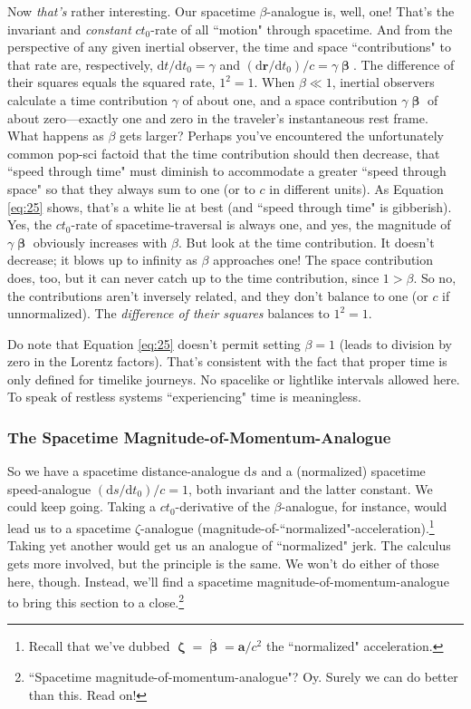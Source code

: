 \documentclass[12pt]{article}
\renewcommand{\vv}[1]{\mathbf{#1}}
\newcommand{\dd}[1]{\mathrm{d}#1}
\newcommand{\vvbeta}{\bm{\upbeta}}
\newcommand{\vvzeta}{\bm{\upzeta}}
\begin{document}
Now \emph{that's} rather interesting. Our spacetime $\beta$-analogue is, well, one! That's the invariant and \emph{constant} $c t_0$-rate of all ``motion" through spacetime. And from the perspective of any given inertial observer, the time and space ``contributions" to that rate are, respectively, $\dd t/ \dd t_0=\gamma$ and $(\dd \vv r / \dd t_0)/c = \gamma \vvbeta$. The difference of their squares equals the squared rate, $1^2 = 1$. When $\beta \ll 1$, inertial observers calculate a time contribution $\gamma$ of about one, and a space contribution $\gamma \vvbeta$ of about zero---exactly one and zero in the traveler's instantaneous rest frame. What happens as $\beta$ gets larger? Perhaps you've encountered the unfortunately common pop-sci factoid that the time contribution should then decrease, that ``speed through time" must diminish to accommodate a greater ``speed through space" so that they always sum to one (or to $c$ in different units). As Equation \ref{eq:25} shows, that's a white lie at best (and ``speed through time" is gibberish). Yes, the $ct_0$-rate of spacetime-traversal is always one, and yes, the magnitude of $\gamma \vvbeta$ obviously increases with $\beta$. But look at the time contribution. It doesn't decrease; it blows up to infinity as $\beta$ approaches one! The space contribution does, too, but it can never catch up to the time contribution, since $1>\beta$. So no, the contributions aren't inversely related, and they don't balance to one (or $c$ if unnormalized). The \emph{difference of their squares} balances to $1^2=1$.

Do note that Equation \ref{eq:25} doesn't permit setting $\beta=1$ (leads to division by zero in the Lorentz factors). That's consistent with the fact that proper time is only defined for timelike journeys. No spacelike or lightlike intervals allowed here. To speak of restless systems ``experiencing" time is meaningless.

\subsubsection{The Spacetime Magnitude-of-Momentum-Analogue}\label{sssec:pc}

So we have a spacetime distance-analogue $\dd s$ and a (normalized) spacetime speed-analogue $(\dd s/\dd t_0)/c=1$, both invariant and the latter constant. We could keep going. Taking a $c t_0$-derivative of the $\beta$-analogue, for instance, would lead us to a spacetime $\zeta$-analogue (magnitude-of-``normalized"-acceleration).\footnote{Recall that we've dubbed $\vvzeta = \dot{\vvbeta} = \vv a / c^2$ the ``normalized" acceleration.} Taking yet another would get us an analogue of ``normalized" jerk. The calculus gets more involved, but the principle is the same. We won't do either of those here, though. Instead, we'll find a spacetime magnitude-of-momentum-analogue to bring this section to a close.\footnote{``Spacetime magnitude-of-momentum-analogue"? Oy. Surely we can do better than this. Read on!}
\end{document}
